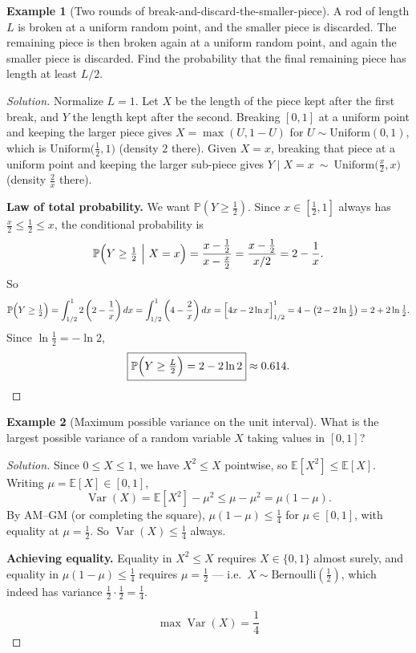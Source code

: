 \documentclass[11pt]{article}
\theoremstyle{definition}
\newtheorem{example}{Example}[section]
\newcommand{\E}{\mathbb{E}}
\newcommand{\Var}{\operatorname{Var}}
\begin{document}
\begin{example}[Two rounds of break-and-discard-the-smaller-piece]
A rod of length $L$ is broken at a uniform random point, and the smaller piece is discarded. The remaining piece is then broken again at a uniform random point, and again the smaller piece is discarded. Find the probability that the final remaining piece has length at least $L/2$.
\end{example}
\begin{proof}[Solution]
Normalize $L=1$. Let $X$ be the length of the piece kept after the first break, and $Y$ the length kept after the second. Breaking $[0,1]$ at a uniform point and keeping the larger piece gives $X=\max(U,1-U)$ for $U\sim\mathrm{Uniform}(0,1)$, which is $\mathrm{Uniform}\bigl(\tfrac12,1\bigr)$ (density $2$ there). Given $X=x$, breaking that piece at a uniform point and keeping the larger sub-piece gives $Y\mid X=x\ \sim\ \mathrm{Uniform}\bigl(\tfrac x2,x\bigr)$ (density $\tfrac2x$ there).

\textbf{Law of total probability.} We want $\mathbb P(Y\ge\tfrac12)$. Since $x\in[\tfrac12,1]$ always has $\tfrac x2\le\tfrac12\le x$, the conditional probability is
\[
\mathbb P\Bigl(Y\ge\tfrac12\ \Big|\ X=x\Bigr)=\frac{x-\tfrac12}{x-\tfrac x2}=\frac{x-\tfrac12}{x/2}=2-\frac1x.
\]
So
\[
\mathbb P\Bigl(Y\ge\tfrac12\Bigr)=\int_{1/2}^1 2\left(2-\frac1x\right)dx=\int_{1/2}^1\left(4-\frac2x\right)dx=\Bigl[4x-2\ln x\Bigr]_{1/2}^{1}=4-\bigl(2-2\ln\tfrac12\bigr)=2+2\ln\tfrac12.
\]
Since $\ln\tfrac12=-\ln2$,
\[
\boxed{\mathbb P\Bigl(Y\ge\tfrac L2\Bigr)=2-2\ln2}\approx0.614.
\]
\end{proof}

\begin{example}[Maximum possible variance on the unit interval]
What is the largest possible variance of a random variable $X$ taking values in $[0,1]$?
\end{example}
\begin{proof}[Solution]
Since $0\le X\le1$, we have $X^2\le X$ pointwise, so $\E[X^2]\le\E[X]$. Writing $\mu=\E[X]\in[0,1]$,
\[
\Var(X)=\E[X^2]-\mu^2\le\mu-\mu^2=\mu(1-\mu).
\]
By AM–GM (or completing the square), $\mu(1-\mu)\le\tfrac14$ for $\mu\in[0,1]$, with equality at $\mu=\tfrac12$. So $\Var(X)\le\tfrac14$ always.

\textbf{Achieving equality.} Equality in $X^2\le X$ requires $X\in\{0,1\}$ almost surely, and equality in $\mu(1-\mu)\le\frac14$ requires $\mu=\frac12$ — i.e.\ $X\sim\mathrm{Bernoulli}(\tfrac12)$, which indeed has variance $\tfrac12\cdot\tfrac12=\tfrac14$.

\[
\boxed{\max\Var(X)=\frac14}
\]
\end{proof}
\end{document}
